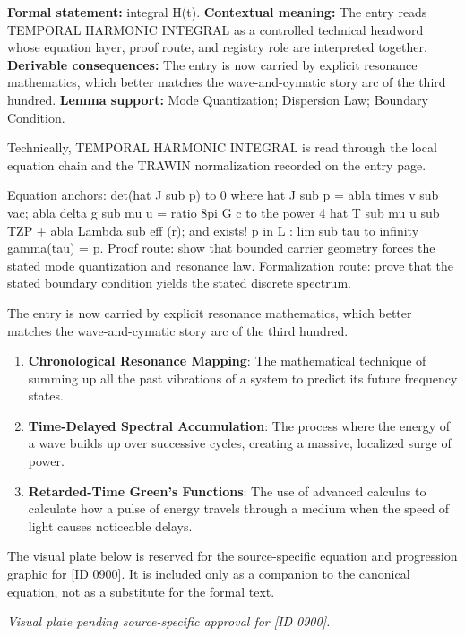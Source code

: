 \begingroup\footnotesize\setlength{\emergencystretch}{3em}\sloppy
\textbf{Formal statement:} integral H(t). \textbf{Contextual meaning:} The entry reads TEMPORAL HARMONIC INTEGRAL as a controlled technical headword whose equation layer, proof route, and registry role are interpreted together. \textbf{Derivable consequences:} The entry is now carried by explicit resonance mathematics, which better matches the wave-and-cymatic story arc of the third hundred. \textbf{Lemma support:} Mode Quantization; Dispersion Law; Boundary Condition.\par
\endgroup

Technically, TEMPORAL HARMONIC INTEGRAL is read through the local equation chain and the TRAWIN normalization recorded on the entry page.

Equation anchors: det(hat J sub p) to 0 where hat J sub p = abla times v sub vac; abla delta g sub mu u = ratio 8pi G c to the power 4 hat T sub mu u sub TZP + abla Lambda sub eff (r); and exists! p in L : lim sub tau to infinity gamma(tau) = p. Proof route: show that bounded carrier geometry forces the stated mode quantization and resonance law. Formalization route: prove that the stated boundary condition yields the stated discrete spectrum.

The entry is now carried by explicit resonance mathematics, which better matches the wave-and-cymatic story arc of the third hundred.
\endgroup

\begin{enumerate}[leftmargin=1.6em,itemsep=6pt,topsep=4pt]
\item \textbf{Chronological Resonance Mapping}: The mathematical technique of summing up all the past vibrations of a system to predict its future frequency states.
\item \textbf{Time-Delayed Spectral Accumulation}: The process where the energy of a wave builds up over successive cycles, creating a massive, localized surge of power.
\item \textbf{Retarded-Time Green's Functions}: The use of advanced calculus to calculate how a pulse of energy travels through a medium when the speed of light causes noticeable delays.
\end{enumerate}

\begingroup\footnotesize\sloppy
The visual plate below is reserved for the source-specific equation and progression graphic for [ID 0900]. It is included only as a companion to the canonical equation, not as a substitute for the formal text.
\par\endgroup
\begingroup\footnotesize\itshape
Visual plate pending source-specific approval for [ID 0900].
\par\endgroup

